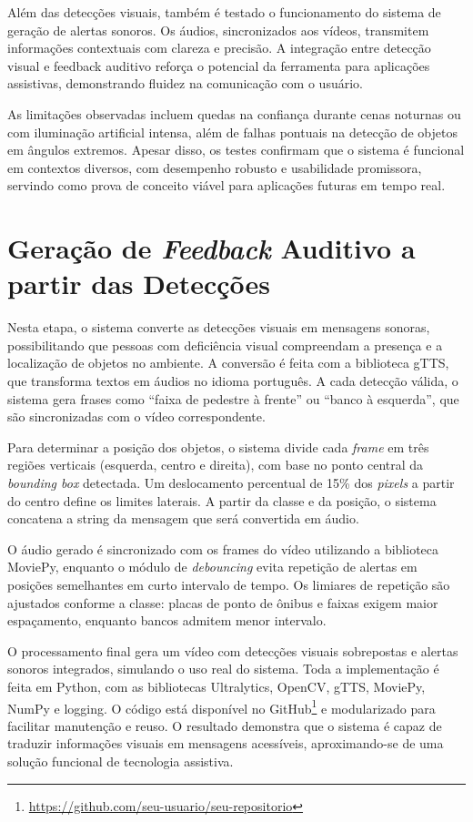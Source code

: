 Além das detecções visuais, também é testado o funcionamento do sistema de geração de alertas sonoros. Os áudios, sincronizados aos vídeos, transmitem informações contextuais com clareza e precisão. A integração entre detecção visual e feedback auditivo reforça o potencial da ferramenta para aplicações assistivas, demonstrando fluidez na comunicação com o usuário.

As limitações observadas incluem quedas na confiança durante cenas noturnas ou com iluminação artificial intensa, além de falhas pontuais na detecção de objetos em ângulos extremos. Apesar disso, os testes confirmam que o sistema é funcional em contextos diversos, com desempenho robusto e usabilidade promissora, servindo como prova de conceito viável para aplicações futuras em tempo real.

\section{\textbf{Geração de \textit{Feedback} Auditivo a partir das Detecções}}

Nesta etapa, o sistema converte as detecções visuais em mensagens sonoras, possibilitando que pessoas com deficiência visual compreendam a presença e a localização de objetos no ambiente. A conversão é feita com a biblioteca gTTS, que transforma textos em áudios no idioma português. A cada detecção válida, o sistema gera frases como “faixa de pedestre à frente” ou “banco à esquerda”, que são sincronizadas com o vídeo correspondente.

Para determinar a posição dos objetos, o sistema divide cada \textit{frame} em três regiões verticais (esquerda, centro e direita), com base no ponto central da \textit{bounding box} detectada. Um deslocamento percentual de 15\% dos \textit{pixels} a partir do centro define os limites laterais. A partir da classe e da posição, o sistema concatena a string da mensagem que será convertida em áudio.

O áudio gerado é sincronizado com os frames do vídeo utilizando a biblioteca MoviePy, enquanto o módulo de \textit{debouncing} evita repetição de alertas em posições semelhantes em curto intervalo de tempo. Os limiares de repetição são ajustados conforme a classe: placas de ponto de ônibus e faixas exigem maior espaçamento, enquanto bancos admitem menor intervalo.

O processamento final gera um vídeo com detecções visuais sobrepostas e alertas sonoros integrados, simulando o uso real do sistema. Toda a implementação é feita em Python, com as bibliotecas Ultralytics, OpenCV, gTTS, MoviePy, NumPy e logging. O código está disponível no GitHub\footnote{\url{https://github.com/seu-usuario/seu-repositorio}} e modularizado para facilitar manutenção e reuso. O resultado demonstra que o sistema é capaz de traduzir informações visuais em mensagens acessíveis, aproximando-se de uma solução funcional de tecnologia assistiva.

